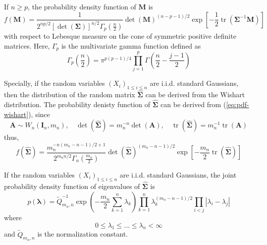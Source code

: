 \begin{theorem}
    If $n\geq p$, the probability density function of $\mathbf{M}$ is
    \begin{equation}
        f\left(\mathbf{M}\right)=\frac{1}{2^{np/2}\left[\operatorname{det}\left(\boldsymbol{\Sigma}\right)\right]^{n/2}\Gamma_{p}\left(\frac{n}{2}\right)}\operatorname{det}\left(\mathbf{M}\right)^{(n-p-1)/2}\exp\left[-\frac{1}{2}\operatorname{tr}\left(\boldsymbol{\Sigma}^{-1}\mathbf{M}\right)\right]
        \label{eq:pdf-wishart}
    \end{equation}
    with respect to Lebesque measure on the cone of symmetric positive definite matrices. Here, $\Gamma_{p}$ is the multivariate gamma function defined as
    \begin{equation*}
        \Gamma_{p}\left(\frac{n}{2}\right)=\pi^{p(p-1)/4}\prod_{j=1}^{p}\Gamma\left(\frac{n}{2}-\frac{j-1}{2}\right)
    \end{equation*}
\end{theorem}

\begin{remark}
    Specially, if the random variables $\left(X_{i}\right)_{1\leq i\leq n}$ are i.i.d. standard Gaussians, then the distribution of the random matrix $\widehat{\boldsymbol{\Sigma}}$ can be derived from the Wishart distribution. The probability denisty function of $\widehat{\boldsymbol{\Sigma}}$ can be derived from (\ref{eq:pdf-wishart}), since
    \begin{equation*}
        \mathbf{A}\sim W_{n}\left(\mathbf{I}_{n},m_{n}\right),\quad\operatorname{det}\left(\widehat{\boldsymbol{\Sigma}}\right)=m_{n}^{-n}\operatorname{det}\left(\mathbf{A}\right),\quad\operatorname{tr}\left(\widehat{\boldsymbol{\Sigma}}\right)=m_{n}^{-1}\operatorname{tr}\left(\mathbf{A}\right)
    \end{equation*}
    thus,
    \begin{equation}
        f\left(\widehat{\boldsymbol{\Sigma}}\right)=\frac{m_{n}^{-n(m_{n}-n-1)/2+1}}{2^{m_{n}n/2}\Gamma_{n}\left(\frac{m_{n}}{2}\right)}\operatorname{det}\left(\widehat{\boldsymbol{\Sigma}}\right)^{(m_{n}-n-1)/2}\exp\left[-\frac{m_{n}}{2}\operatorname{tr}\left(\widehat{\boldsymbol{\Sigma}}\right)\right]
    \end{equation}
\end{remark}

\begin{theorem}
    If the random variables $\left(X_{i}\right)_{1\leq i\leq n}$ are i.i.d. standard Gaussians, the joint probability density function of eigenvalues of $\widehat{\boldsymbol{\Sigma}}$ is
    \begin{equation}
        p\left(\boldsymbol{\lambda}\right)=\widetilde{Q}_{m_{n},n}^{-1}\exp\left(-\frac{m_{n}}{2}\sum_{k=1}^{n}\lambda_{k}\right)\prod_{k=1}^{n}\lambda_{k}^{(m_{n}-n-1)/2}\prod_{i<j}\left|\lambda_{i}-\lambda_{j}\right|
        \label{eq:jpdf-eigenvalues-sigma}
    \end{equation}
    where
    \begin{equation*}
        0\leq\lambda_{1}\leq\ldots\leq\lambda_{n}<\infty
    \end{equation*}
    and $\widetilde{Q}_{m_{n},n}$ is the normalization constant.
\end{theorem}

